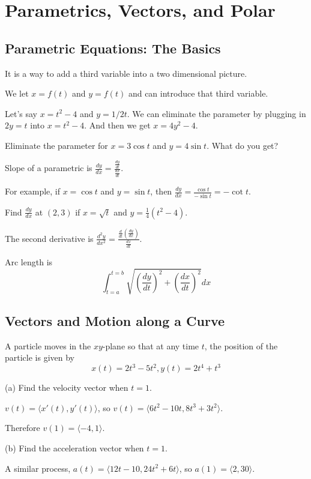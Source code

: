 \documentclass[../bccalc.tex]{subfiles}
\begin{document}
\chapter{Parametrics, Vectors, and Polar}
\section{Parametric Equations: The Basics}
It is a way to add a third variable into a two dimensional picture.

We let $x=f(t)$ and $y=f(t)$ and can introduce that third variable.

Let's say $x=t^2-4$ and $y=1/2t$. We can eliminate the parameter by plugging in $2y=t$ into $x=t^2-4$. And then we get $x=4y^2-4$.

\ex Eliminate the parameter for $x=3\cos t$ and $y=4\sin t$. What do you get?

Slope of a parametric is $\frac{dy}{dx}=\frac{\frac{dy}{dt}}{\frac{dx}{dt}}$.

For example, if $x=\cos t$ and $y=\sin t$, then $\frac{dy}{dx}=\frac{\cos t}{-\sin t}=-\cot t$.

\ex Find $\frac{dy}{dx}$ at $(2,3)$ if $x=\sqrt{t}$ and $y=\frac{1}{4}(t^2-4)$.

The second derivative is $\frac{d^2 y}{dx^2}=\frac{\frac{d}{dt}\left(\frac{dy}{dx}\right)}{\frac{dx}{dt}}$.

Arc length is 
\[ \int_{t=a}^{t=b}\sqrt{\left(\frac{dy}{dt}\right)^2+\left(\frac{dx}{dt}\right)^2}dx \]


\section{Vectors and Motion along a Curve}
\begin{example}
    A particle moves in the $xy$-plane so that at any time $t$, the position of the particle is given by 
    \[ x(t)=2t^3-5t^2, y(t)=2t^4+t^3 \]

    (a) Find the velocity vector when $t=1$.

    $v(t)=\langle x'(t), y'(t)\rangle$, so $v(t)=\langle 6t^2-10t, 8t^3+3t^2\rangle$.

    Therefore $v(1)=\langle -4,1\rangle$.

    (b) Find the acceleration vector when $t=1$.

    A similar process, $a(t)=\langle 12t-10, 24t^2+6t\rangle$, so $a(1)=\langle 2,30\rangle$.
\end{example}
\end{document}
